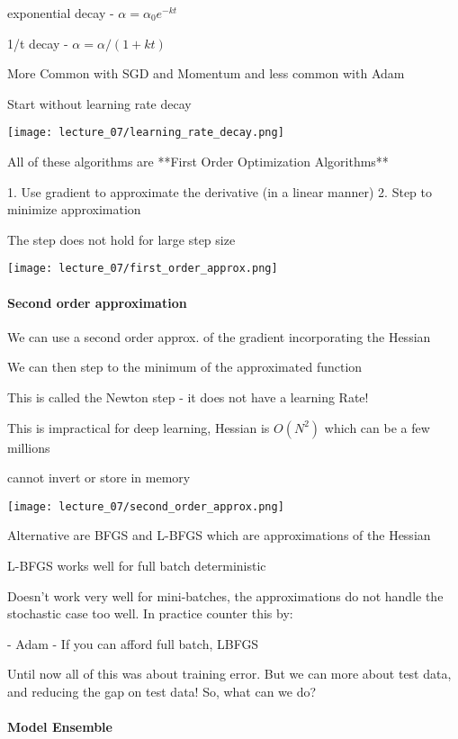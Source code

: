 exponential decay - $\alpha = \alpha_0e^{-kt}$ 

1/t decay - $\alpha = \alpha / (1+kt) $ 

More Common with SGD and Momentum and less common with Adam

Start without learning rate decay

\texttt{[image: lecture\_07/learning\_rate\_decay.png]}

All of these algorithms are **First Order Optimization Algorithms**

1. Use gradient to approximate the derivative (in a linear manner)
2. Step to minimize approximation

The step does not hold for large step size

\texttt{[image: lecture\_07/first\_order\_approx.png]}

\paragraph{Second order approximation}

We can use a second order approx. of the gradient incorporating the Hessian

We can then step to the minimum of the approximated function

This is called the Newton step - it does not have a learning Rate!

This is impractical for deep learning, Hessian is $O(N^2)$ which can be a few millions

cannot invert or store in memory

\texttt{[image: lecture\_07/second\_order\_approx.png]}

Alternative are BFGS and L-BFGS which are approximations of the Hessian

L-BFGS works well for full batch deterministic 

Doesn't work very well for mini-batches, the approximations do not handle the stochastic case too well. In practice counter this by:

- Adam
- If you can afford full batch, LBFGS

Until now all of this was about training error. But we can more about test data, and reducing the gap on test data! So, what can we do? 

\paragraph{Model Ensemble}

